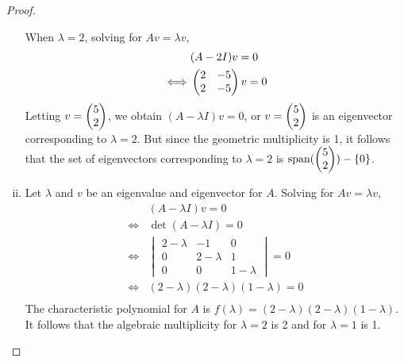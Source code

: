 \begin{proof}
\begin{enumerate}[(i)]
              When $\lambda=2$, solving for $Av=\lambda v$,
              \[
                  \begin{aligned}
                       & (A-2I)v=0                   \\
                      \iff
                       & \begin{pmatrix} 2 &-5\\ 2 &-5 \end{pmatrix}v=0
                  \end{aligned}
              \]
              Letting $v=\begin{pmatrix} 5\\ 2\end{pmatrix}$, we obtain $(A-\lambda I)v=0$, or $v=\begin{pmatrix} 5\\ 2\end{pmatrix}$ is an eigenvector corresponding to $\lambda=2$.
              But since the geometric multiplicity is 1, it follows that the set of eigenvectors corresponding to $\lambda=2$ is $\textnormal{span}(\begin{pmatrix} 5\\ 2\end{pmatrix})-\{0\}$.
        \item Let $\lambda$ and $v$ be an eigenvalue and eigenvector for $A$.
              Solving for $Av=\lambda v$,
              \[
                  \begin{aligned}
                       & (A-\lambda I)v=0                    \\
                      \iff
                       & \det(A-\lambda I)=0                 \\
                      \iff
                       & \begin{vmatrix}
                             2-\lambda & -1        & 0         \\
                             0         & 2-\lambda & 1         \\
                             0         & 0         & 1-\lambda
                         \end{vmatrix}=0   \\
                      \iff
                       & (2-\lambda)(2-\lambda)(1-\lambda)=0 \\
                  \end{aligned}
              \]
              The characteristic polynomial for $A$ is $f(\lambda)=(2-\lambda)(2-\lambda)(1-\lambda)$.
              It follows that the algebraic multiplicity for $\lambda=2$ is 2 and for $\lambda=1$ is 1.


\end{enumerate}
\end{proof}
